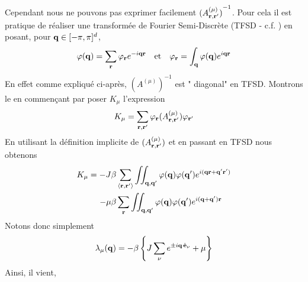 \documentclass[10pt]{article}
\begin{document}
\begin{multicols}{2}
Cependant nous ne pouvons pas exprimer facilement ${(A_{{\bf r}, {\bf r}'}^{(\mu)})}^{-1}$. Pour cela il est pratique de réaliser une transformée de Fourier Semi-Discrète (TFSD - c.f. ) en posant, pour ${\bf q} \in [-\pi, \pi]^d$,
\begin{equation}
  {\varphi}({\bf q}) = \sum_{\bf r} \varphi_{\bf r} e^{-i{\bf q}{\bf r}} \quad \text{et} \quad \varphi_{\bf r} = \int_{\bf q} {\varphi}({\bf q})  e^{i{\bf q}{\bf r}}
\end{equation}
En effet comme expliqué ci-après, ${(A^{(\mu)})}^{-1}$ est " diagonal" en TFSD. Montrons le en commençant par poser $K_\mu$ l'expression
\begin{equation}
	K_\mu = \sum\limits_{{\bf r}, {\bf r}'} \varphi_{\bf r} {(A_{{\bf r}, {\bf r}'}^{(\mu)})} \varphi_{{\bf r}'}
\end{equation} 
En utilisant la définition implicite de ${(A_{{\bf r}, {\bf r}'}^{(\mu)})}$ et en passant en TFSD nous obtenons
\begin{equation}
\begin{split}
  K_\mu = -J\beta & \sum_{\left<{\bf r}, {\bf r}'\right>} \iint_{{\bf q},{\bf q}'} {\varphi}({\bf q}) {\varphi}({\bf q}')  e^{i({\bf q}{\bf r}+{\bf q}'{\bf r}')} \\
   -\mu\beta & \sum_{\bf r} \iint_{{\bf q},{\bf q}'} {\varphi}({\bf q}) {\varphi}({\bf q}')  e^{i({\bf q}+{\bf q}'){\bf r}}
\end{split}
\end{equation}
Notons donc simplement
\begin{equation}
  \lambda_\mu({\bf q}) = -\beta \left\{ J\sum_{\nu} e^{ \pm i {\bf q} \, \hat{\mathbf{e}}_\nu} +\mu \right\} 
\end{equation}
Ainsi, il vient, 

\end{multicols}
\end{document}
